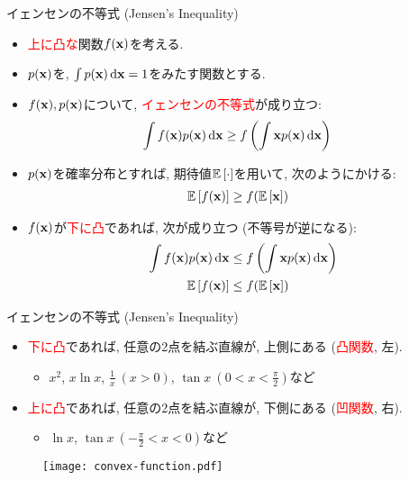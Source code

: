 \documentclass[dvipdfmx,notheorems,t]{beamer}
\begin{document}
\begin{frame}{イェンセンの不等式 (Jensen's Inequality)}
\begin{itemize}
  \item \textcolor{red}{上に凸な}関数$f(\vb{x})$を考える.
  \item $p(\vb{x})$を, $\int p(\vb{x}) \dd{\vb{x}} = 1$をみたす関数とする.
  \item $f(\vb{x}), p(\vb{x})$について, \textcolor{red}{イェンセンの不等式}が成り立つ:
  \begin{align*}
    \int f(\vb{x}) p(\vb{x}) \dd{\vb{x}} &\ge f \left( \int \vb{x} p(\vb{x}) \dd{\vb{x}} \right)
  \end{align*}
  \item $p(\vb{x})$を確率分布とすれば, 期待値$\operatorname{\mathbb{E}} \left[ \cdot \right]$を用いて, 次のようにかける:
  \begin{align*}
    \operatorname{\mathbb{E}} \left[ f(\vb{x}) \right] &\ge f(\operatorname{\mathbb{E}} \left[ \vb{x} \right])
  \end{align*}
  \item $f(\vb{x})$が\textcolor{red}{下に凸}であれば, 次が成り立つ (不等号が逆になる):
  \begin{align*}
    \int f(\vb{x}) p(\vb{x}) \dd{\vb{x}} &\le f \left( \int \vb{x} p(\vb{x}) \dd{\vb{x}} \right) \\
    \operatorname{\mathbb{E}} \left[ f(\vb{x}) \right] &\le f(\operatorname{\mathbb{E}} \left[ \vb{x} \right])
  \end{align*}
\end{itemize}
\end{frame}

\begin{frame}{イェンセンの不等式 (Jensen's Inequality)}
\begin{itemize}
  \item \textcolor{red}{下に凸}であれば, 任意の2点を結ぶ直線が, 上側にある (\textcolor{red}{凸関数}, 左).
  \begin{itemize}
    \item $x^2$, $x \ln x$, $\frac{1}{x} \ (x > 0)$, $\tan x \ (0 < x < \frac{\pi}{2})$など
  \end{itemize}
  \item \textcolor{red}{上に凸}であれば, 任意の2点を結ぶ直線が, 下側にある (\textcolor{red}{凹関数}, 右).
  \begin{itemize}
    \item $\ln x$, $\tan x \ (-\frac{\pi}{2} < x < 0)$など
  \end{itemize}
\end{itemize}

\begin{figure}
  \centering
  \texttt{[image: convex-function.pdf]}
\end{figure}
\end{frame}
\end{document}
